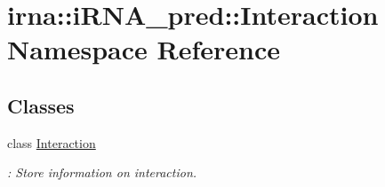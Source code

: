 \hypertarget{namespaceirna_1_1iRNA__pred_1_1Interaction}{
\section{irna\-:\-:i\-R\-N\-A\-\_\-pred\-:\-:\-Interaction \-Namespace \-Reference}
\label{namespaceirna_1_1iRNA__pred_1_1Interaction}
}
\subsection*{\-Classes}
\begin{DoxyCompactItemize}
\item 
class \hyperlink{classirna_1_1iRNA__pred_1_1Interaction_1_1Interaction}{\-Interaction}
\begin{DoxyCompactList}\small\item\em \-: \-Store information on interaction. \end{DoxyCompactList}\end{DoxyCompactItemize}
